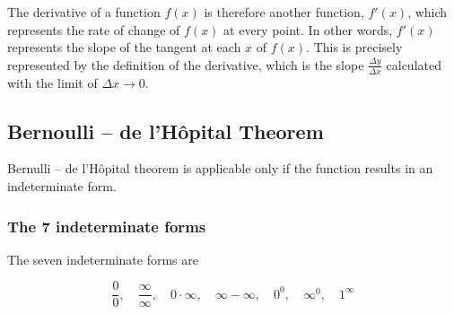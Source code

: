 \documentclass{article}
\begin{document}
\begin{minipage}{0.5\textwidth}
\end{minipage}
\begin{minipage}{0.5\textwidth}
The derivative of a function \(f(x)\) is therefore another function, \(f'(x)\), which
represents the rate of change of \(f(x)\) at every point. In other words, \(f'(x)\)
represents the slope of the tangent at each \(x\) of \(f(x)\).
This is precisely represented by the definition of the derivative, which is the slope
\(\frac{\Delta y}{\Delta x}\) calculated with the limit of \(\Delta x \to 0\).
\end{minipage}

\subsection{Bernoulli -- de l'Hôpital Theorem}
Bernulli -- de l'Hôpital theorem is applicable only if the function
results in an indeterminate form.

\subsubsection{The 7 indeterminate forms}

The seven indeterminate forms are
\begin{center}
    \[
        \frac{0}{0}, \quad
        \frac{\infty}{\infty}, \quad
        0 \cdot \infty, \quad
        \infty - \infty, \quad
        0^0, \quad
        \infty^0, \quad
        1^\infty
    \]
\end{center}
\end{document}
